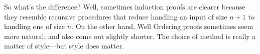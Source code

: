 \iffalse

\begin{notesproblem}
  Use Strong Induction to prove the Well Ordering Principle.
  \hint Prove that if a set of nonnegative integers contains an integer,
  $n$, then it has a smallest element.
\end{notesproblem}
\fi

So what's the difference?  Well, sometimes induction proofs are clearer
because they resemble recursive procedures that reduce handling an input
of size $n+1$ to handling one of size $n$.  On the other hand, Well
Ordering proofs sometimes seem more natural, and also come out slightly
shorter.  The choice of method is really a matter of style---but style
does matter.


\endinput
